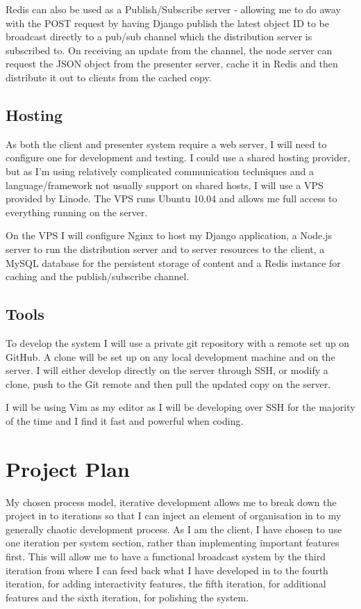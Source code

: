 \documentclass[a4papert,11pt,notitlepage]{ltxdoc}
\begin{document}
Redis can also be used as a Publish/Subscribe server - allowing me to do away with the POST request by having Django publish the latest object ID to be broadcast directly to a pub/sub channel which the distribution server is subscribed to. On receiving an update from the channel, the node server can request the JSON object from the presenter server, cache it in Redis and then distribute it out to clients from the cached copy.

\subsection{Hosting}
As both the client and presenter system require a web server, I will need to configure one for development and testing. I could use a shared hosting provider, but as I'm using relatively complicated communication techniques and a language/framework not usually support on shared hosts, I will use a VPS provided by Linode. The VPS runs Ubuntu 10.04 and allows me full access to everything running on the server.

On the VPS I will configure Nginx to host my Django application, a Node.js server to run the distribution server and to server resources to the client, a MySQL database for the persistent storage of content and a Redis instance for caching and the publish/subscribe channel.

\subsection{Tools}
To develop the system I will use a private git repository with a remote set up on GitHub. A clone will be set up on any local development machine and on the server. I will either develop directly on the server through SSH, or modify a clone, push to the Git remote and then pull the updated copy on the server.

I will be using Vim as my editor as I will be developing over SSH for the majority of the time and I find it fast and powerful when coding.

\section{Project Plan}
My chosen process model, iterative development allows me to break down the project in to iterations so that I can inject an element of organisation in to my generally chaotic development process. As I am the client, I have chosen to use one iteration per system section, rather than implementing important features first. This will allow me to have a functional broadcast system by the third iteration from where I can feed back what I have developed in to the fourth iteration, for adding interactivity features, the fifth iteration, for additional features and the sixth iteration, for polishing the system.
\end{document}
